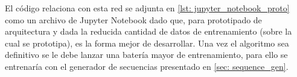 El código relaciona con esta red se adjunta en \ref{lst: jupyter_notebook_proto} como un archivo de Jupyter Notebook dado que, para prototipado de arquitectura y dada la reducida cantidad de datos de entrenamiento (sobre la cual se prototipa), es la forma mejor de desarrollar. Una vez el algoritmo sea definitivo se le debe lanzar una batería mayor de entrenamiento, para ello se entrenaría con el generador de secuencias presentado en \ref{sec: sequence_gen}.